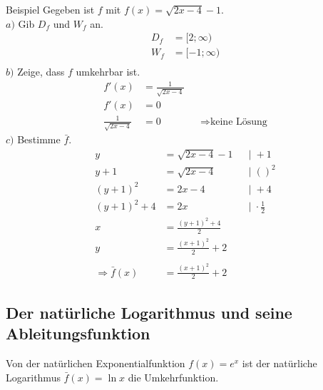 \documentclass{article}
\begin{document}
\begin{boxx}[DarkBlue]{Beispiel}
    Gegeben ist $f$ mit $f(x)= \sqrt{2x-4} - 1$.\\
    $a)$\hspace{3mm} Gib $D_f$ und $W_f$ an.
    \begin{align*}
        D_f &= [2; \infty) \\
        W_f &= [-1; \infty) \\
    \end{align*}
    $b)$\hspace{3mm} Zeige, dass $f$ umkehrbar ist.
    \begin{align*}
        && f'(x) &= \frac{1}{\sqrt{2x-4}} \\
        && f'(x) &= 0 \\
        && \frac{1}{\sqrt{2x-4}} &= 0 & &\Rightarrow \text{keine Lösung} &&
    \end{align*}
    $c)$\hspace{3mm} Bestimme $\bar{f}$.
    \begin{align*}
        y &= \sqrt{2x-4} -1 & &|\;+1 \\
        y+1 &= \sqrt{2x-4}  & &|\;()^2 \\
        (y+1)^2 &= 2x-4  & &|\;+4 \\
        (y+1)^2 +4 &= 2x  & &|\;\cdot \frac{1}{2} \\
        x&=\frac{(y+1)^2 + 4}{2} \\
        y &=\frac{(x+1)^2}{2} +2 \\\\
        \Rightarrow \bar{f}(x) &= \frac{(x+1)^2}{2} +2
        \end{align*}
\end{boxx}

\subsection{Der natürliche Logarithmus und seine Ableitungsfunktion}

Von der natürlichen Exponentialfunktion $f(x) = e^x$ ist der natürliche Logarithmus $\bar{f}(x)=\ln x$
die Umkehrfunktion.
\end{document}
